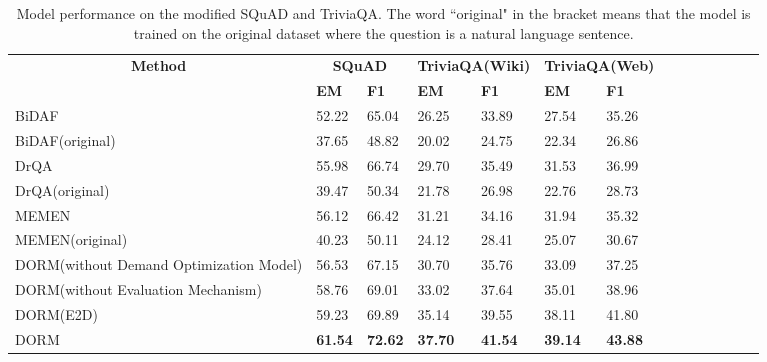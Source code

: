 \documentclass[sigconf]{acmart}
\begin{document}
\begin{table*}[t]
\centering
\label{my-label}
\begin{tabular}{lp{1cm}lp{1cm}lp{1cm}lp{1cm}lp{1cm}lp{1cm}lp{1cm}}
\hline
\multicolumn{1}{c}{\multirow{2}{*}{\textbf{Method}}} & \multicolumn{2}{c}{\textbf{SQuAD}} & \multicolumn{2}{l}{\textbf{TriviaQA(Wiki)}} & \multicolumn{2}{c}{\textbf{TriviaQA(Web)}} \\ \cline{2-7} 
\multicolumn{1}{c}{}                        & \textbf{EM}          & \textbf{F1}    & \textbf{EM}     & \textbf{F1}      & \textbf{EM}  & \textbf{F1}  \\ \hline
BiDAF                                       & 52.22       & 65.04       &         26.25           &   33.89                 & 27.54 &  35.26   \\
BiDAF(original)                             & 37.65       & 48.82       &         20.02       &  24.75               & 22.34    & 26.86    \\
DrQA                                        & 55.98       & 66.74       &          29.70           &   35.49                 & 31.53  &  36.99     \\
DrQA(original)                              & 39.47       & 50.34       &             21.78  &  26.98               & 22.76   & 28.73    \\
MEMEN                                       & 56.12       & 66.42       &      31.21              &  34.16                  & 31.94    &  35.32   \\
MEMEN(original)                             & 40.23       & 50.11       &      24.12              &    28.41                &       25.07       &    30.67 \\ \hline
DORM(without Demand Optimization Model)     & 56.53       & 67.15       &  30.70       &    35.76         &      33.09         &  37.25   \\
DORM(without Evaluation Mechanism)          & 58.76       & 69.01       &    33.02           &         37.64           & 35.01        & 38.96    \\
DORM(E2D)                                            & 59.23       & 69.89       &    35.14           &         39.55           & 38.11        & 41.80    \\
DORM                                        & \textbf{61.54}       & \textbf{72.62}  & \textbf{37.70}  & \textbf{41.54}   &  \textbf{39.14}  & \textbf{43.88 }   \\ \hline
\end{tabular}
  \vspace{2mm}
  \caption{Model performance on the modified SQuAD and TriviaQA. The word ``original" in the bracket means that the model is trained on the original dataset where the question is a natural language sentence.}       
\end{table*}
\end{document}

